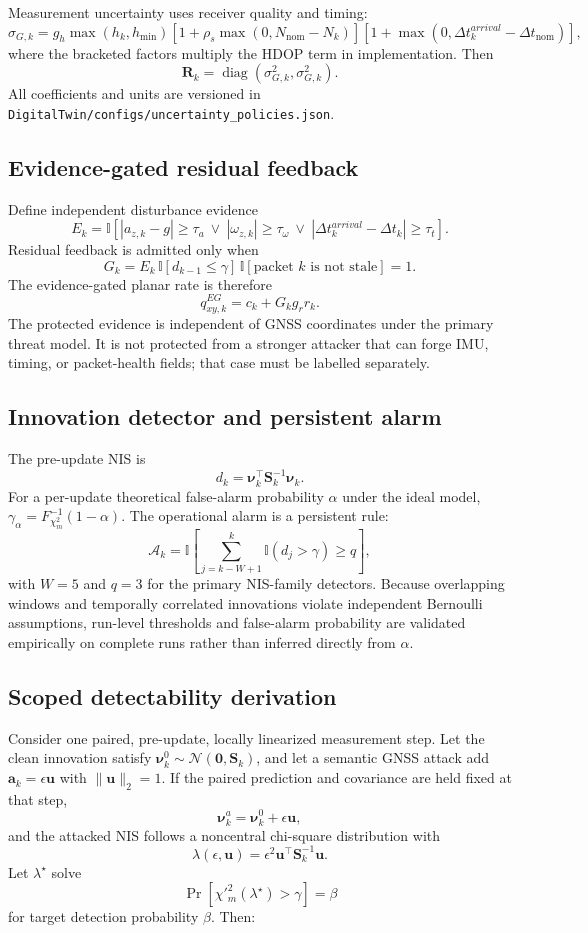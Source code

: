 \documentclass[11pt,a4paper]{article}
\newcommand{\I}{\mathbb{I}}
\newcommand{\diag}{\operatorname{diag}}
\begin{document}
Measurement uncertainty uses receiver quality and timing:
\[
\sigma_{G,k}=g_h\max(h_k,h_{\min})
\left[1+\rho_s\max(0,N_{\mathrm{nom}}-N_k)\right]
\left[1+\max(0,\Delta t_k^{arrival}-\Delta t_{\mathrm{nom}})\right],
\]
where the bracketed factors multiply the HDOP term in implementation. Then
\[
\mathbf R_k=\diag(\sigma_{G,k}^2,\sigma_{G,k}^2).
\]
All coefficients and units are versioned in
\texttt{DigitalTwin/configs/uncertainty\_policies.json}.

\subsection{Evidence-gated residual feedback}

Define independent disturbance evidence
\[
E_k=\I\!\left[
|a_{z,k}-g|\ge\tau_a
\ \lor\ |\omega_{z,k}|\ge\tau_\omega
\ \lor\ |\Delta t_k^{arrival}-\Delta t_k|\ge\tau_t
\right].
\]
Residual feedback is admitted only when
\[
G_k=E_k\,
\I[d_{k-1}\le\gamma]\,
\I[\text{packet }k\text{ is not stale}]=1.
\]
The evidence-gated planar rate is therefore
\[
q_{xy,k}^{EG}=c_k+G_k g_r r_k.
\]
The protected evidence is independent of GNSS coordinates under the primary
threat model. It is not protected from a stronger attacker that can forge IMU,
timing, or packet-health fields; that case must be labelled separately.

\subsection{Innovation detector and persistent alarm}

The pre-update NIS is
\[
d_k=\boldsymbol\nu_k^\top\mathbf S_k^{-1}\boldsymbol\nu_k.
\]
For a per-update theoretical false-alarm probability $\alpha$ under the ideal
model, $\gamma_\alpha=F_{\chi^2_m}^{-1}(1-\alpha)$. The operational alarm is a
persistent rule:
\[
\mathcal A_k=
\I\!\left[
\sum_{j=k-W+1}^{k}\I(d_j>\gamma)\ge q
\right],
\]
with $W=5$ and $q=3$ for the primary NIS-family detectors. Because overlapping
windows and temporally correlated innovations violate independent Bernoulli
assumptions, run-level thresholds and false-alarm probability are validated
empirically on complete runs rather than inferred directly from $\alpha$.

\subsection{Scoped detectability derivation}

Consider one paired, pre-update, locally linearized measurement step. Let the
clean innovation satisfy
$\boldsymbol\nu_k^0\sim\mathcal N(\mathbf0,\mathbf S_k)$, and let a semantic
GNSS attack add $\mathbf a_k=\epsilon\mathbf u$ with
$\|\mathbf u\|_2=1$. If the paired prediction and covariance are held fixed at
that step,
\[
\boldsymbol\nu_k^a=\boldsymbol\nu_k^0+\epsilon\mathbf u,
\]
and the attacked NIS follows a noncentral chi-square distribution with
\[
\lambda(\epsilon,\mathbf u)
=\epsilon^2\mathbf u^\top\mathbf S_k^{-1}\mathbf u.
\]
Let $\lambda^\star$ solve
\[
\Pr\!\left[
\chi'^2_m(\lambda^\star)>\gamma
\right]=\beta
\]
for target detection probability $\beta$. Then:
\end{document}

